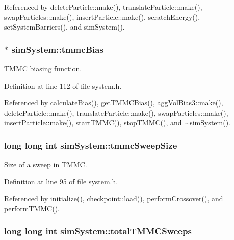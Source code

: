 Referenced by delete\-Particle\-::make(), translate\-Particle\-::make(), swap\-Particles\-::make(), insert\-Particle\-::make(), scratch\-Energy(), set\-System\-Barriers(), and sim\-System().

\hypertarget{classsim_system_a13173f45a1e40a5f5a3552b0ebe15b54}{
\subsubsection[{tmmc\-Bias}]{$\ast$ sim\-System\-::tmmc\-Bias}}\label{classsim_system_a13173f45a1e40a5f5a3552b0ebe15b54}


T\-M\-M\-C biasing function. 



Definition at line 112 of file system.\-h.



Referenced by calculate\-Bias(), get\-T\-M\-M\-C\-Bias(), agg\-Vol\-Bias3\-::make(), delete\-Particle\-::make(), translate\-Particle\-::make(), swap\-Particles\-::make(), insert\-Particle\-::make(), start\-T\-M\-M\-C(), stop\-T\-M\-M\-C(), and $\sim$sim\-System().

\hypertarget{classsim_system_a56e284a361964d0a9ce5c45f41d56ab1}{
\subsubsection[{tmmc\-Sweep\-Size}]{\setlength{\rightskip}{0pt plus 5cm}long long int sim\-System\-::tmmc\-Sweep\-Size}}\label{classsim_system_a56e284a361964d0a9ce5c45f41d56ab1}


Size of a sweep in T\-M\-M\-C. 



Definition at line 95 of file system.\-h.



Referenced by initialize(), checkpoint\-::load(), perform\-Crossover(), and perform\-T\-M\-M\-C().

\hypertarget{classsim_system_a78b107e20bcbf2f818264fa076de5db3}{
\subsubsection[{total\-T\-M\-M\-C\-Sweeps}]{\setlength{\rightskip}{0pt plus 5cm}long long int sim\-System\-::total\-T\-M\-M\-C\-Sweeps}}\label{classsim_system_a78b107e20bcbf2f818264fa076de5db3}


